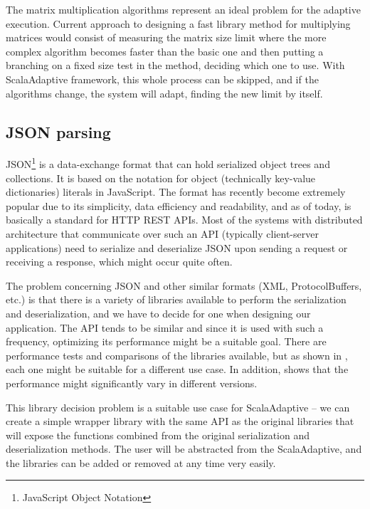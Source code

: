 The matrix multiplication algorithms represent an ideal problem for the adaptive execution. Current approach to designing a fast library method for multiplying matrices would consist of measuring the matrix size limit where the more complex algorithm becomes faster than the basic one and then putting a branching on a fixed size test in the method, deciding which one to use. With ScalaAdaptive framework, this whole process can be skipped, and if the algorithms change, the system will adapt, finding the new limit by itself.

\subsection{JSON parsing}
\label{subsec:json_parsing}

JSON\footnote{JavaScript Object Notation} is a data-exchange format that can hold serialized object trees and collections. It is based on the notation for object (technically key-value dictionaries) literals in JavaScript. The format has recently become extremely popular due to its simplicity, data efficiency and readability, and as of today, is basically a standard for HTTP REST APIs. Most of the systems with distributed architecture that communicate over such an API (typically client-server applications) need to serialize and deserialize JSON upon sending a request or receiving a response, which might occur quite often.

The problem concerning JSON and other similar formats (XML, ProtocolBuffers, etc.) is that there is a variety of libraries available to perform the serialization and deserialization, and we have to decide for one when designing our application. The API tends to be similar and since it is used with such a frequency, optimizing its performance might be a suitable goal. There are performance tests and comparisons of the libraries available, but as shown in \cite{dreyfuss_ultimate_2015}, each one might be suitable for a different use case. In addition, \cite{Trojanek:Thesis:2013} shows that the performance might significantly vary in different versions.

This library decision problem is a suitable use case for ScalaAdaptive -- we can create a simple wrapper library with the same API as the original libraries that will expose the functions combined from the original serialization and deserialization methods. The user will be abstracted from the ScalaAdaptive, and the libraries can be added or removed at any time very easily.


